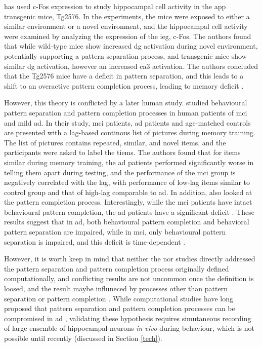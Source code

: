 \citet{palmer11} has used c-Fos expression to study hippocampal cell activity in the \gls{app} transgenic mice, Tg2576. In the experiments, the mice were exposed to either a similar environment or a novel environment, and the hippocampal cell activity were examined by analyzing the expression of the \gls{ieg}, c-Fos. The authors found that while wild-type mice show increased \gls{dg} activation during novel environment, potentially supporting a pattern separation process, and transgenic mice show similar \gls{dg} activation, however an increased \gls{ca3} activation. The authors concluded that the Tg2576 mice have a deficit in pattern separation, and this leads to a shift to an overactive pattern completion process, leading to memory deficit \citep{palmer11}.

However, this theory is conflicted by a later human study. \citet{ally13} studied behavioural pattern separation and pattern completion processes in human patients of \gls{mci} and mild \gls{ad}. In their study, \gls{mci} patients, \gls{ad} patients and age-matched controls are presented with a lag-based continous list of pictures during memory training. The list of pictures contains repeated, similar, and novel items, and the participants were asked to label the tiems. The authors found that for items similar during memory training, the \gls{ad} patients performed significantly worse in telling them apart during testing, and the performance of the \gls{mci} group is negatively correlated with the lag, with performance of low-lag items similar to control group and that of high-lag comparable to \gls{ad}.  In addition, \citet{ally13} also looked at the pattern completion process. Interestingly, while the \gls{mci} patients have intact behavioural pattern completion, the \gls{ad} patients have a significant deficit \citep{ally13}. These results suggest that in \gls{ad}, both behavioural pattern completion and behavioral pattern separation are impaired, while in \gls{mci}, only behavioural pattern separation is impaired, and this deficit is time-dependent \citep{ally13}.

However, it is worth keep in mind that neither the \citet{palmer11} nor \citet{ally13} studies directly addressed the pattern separation and pattern completion process originally defined computationally, and conflicting results are not uncommon once the definition is loosed, and the result maybe influneced by processes other than pattern separation or pattern completion \citep{
santoro13}. While computational studies have long proposed that pattern separation and pattern completion processes can be compromised in \gls{ad} \citep{horn93, hasselmo94, hasselmo97}, validating these hypothesis requires simutaneous recording of large ensemble of hippocampal neurons \textit{in vivo} during behaviour, which is not possible until recently (discussed in Section \ref{tech}). 

